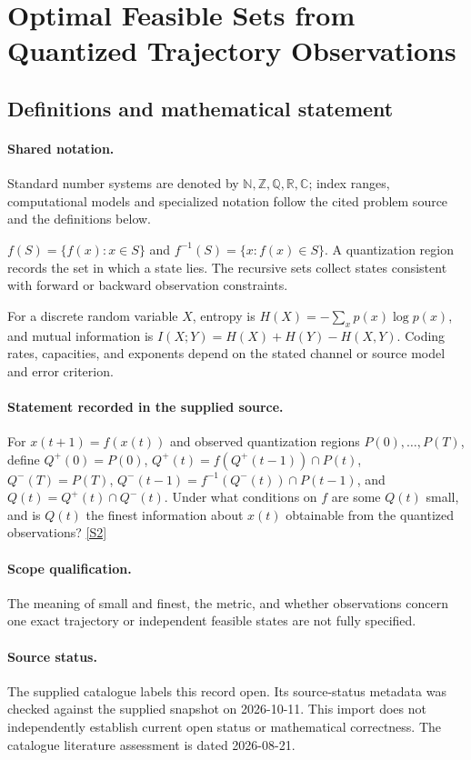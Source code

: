 \documentclass[11pt]{article}
\newcommand{\sref}[2]{\hyperlink{source:#1:#2}{[S#2]}}
\begin{document}
\section{Optimal Feasible Sets from Quantized Trajectory Observations}\label{statement}

\subsection{Definitions and mathematical statement}

\paragraph{Shared notation.}Standard number systems are denoted by $\mathbb N,\mathbb Z,\mathbb Q,\mathbb R,\mathbb C$; index ranges, computational models and specialized notation follow the cited problem source and the definitions below.


$f(S)=\{f(x):x\in S\}$ and $f^{-1}(S)=\{x:f(x)\in S\}$. A quantization region records the set in which a state lies. The recursive sets collect states consistent with forward or backward observation constraints.

For a discrete random variable $X$, entropy is $H(X)=-\sum_xp(x)\log p(x)$, and mutual information is $I(X;Y)=H(X)+H(Y)-H(X,Y)$. Coding rates, capacities, and exponents depend on the stated channel or source model and error criterion.
\paragraph{Statement recorded in the supplied source.}
For $x(t+1)=f(x(t))$ and observed quantization regions $P(0),\ldots,P(T)$, define $Q^+(0)=P(0)$, $Q^+(t)=f(Q^+(t-1))\cap P(t)$, $Q^-(T)=P(T)$, $Q^-(t-1)=f^{-1}(Q^-(t))\cap P(t-1)$, and $Q(t)=Q^+(t)\cap Q^-(t)$. Under what conditions on $f$ are some $Q(t)$ small, and is $Q(t)$ the finest information about $x(t)$ obtainable from the quantized observations? \sref{statement}{2}
\paragraph{Scope qualification.}
The meaning of small and finest, the metric, and whether observations concern one exact trajectory or independent feasible states are not fully specified.
\paragraph{Source status.}
The supplied catalogue labels this record open. Its source-status metadata was checked against the supplied snapshot on 2026-10-11. This import does not independently establish current open status or mathematical correctness. The catalogue literature assessment is dated 2026-08-21.
\end{document}
